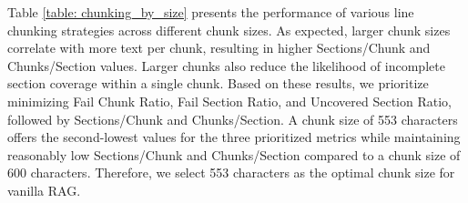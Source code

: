 Table \ref{table: chunking_by_size} presents the performance of various line chunking strategies across different chunk sizes. As expected, larger chunk sizes correlate with more text per chunk, resulting in higher Sections/Chunk and Chunks/Section values. Larger chunks also reduce the likelihood of incomplete section coverage within a single chunk. Based on these results, we prioritize minimizing {Fail Chunk Ratio}, {Fail Section Ratio}, and {Uncovered Section Ratio}, followed by Sections/Chunk and Chunks/Section. A chunk size of 553 characters offers the second-lowest values for the three prioritized metrics while maintaining reasonably low Sections/Chunk and Chunks/Section compared to a chunk size of 600 characters. Therefore, we select 553 characters as the optimal chunk size for vanilla RAG.

\begin{table}[H]
\centering
{}
\end{table}

